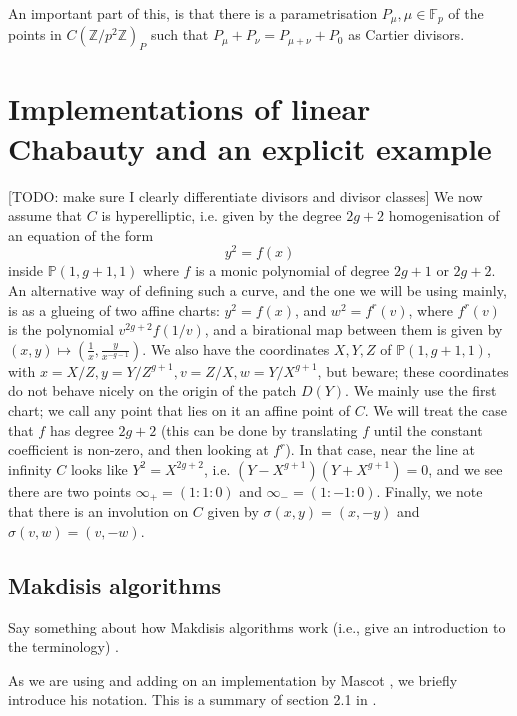 \documentclass[12pt]{article}
\newcommand{\Z}{\mathbb{Z}}
\renewcommand{\P}{\mathbb{P}}
\newcommand{\F}{\mathbb{F}}
\theoremstyle{plain}
\theoremstyle{definition}
\theoremstyle{remark}
\begin{document}
An important part of this, is that there is a parametrisation $P_\mu, \mu \in \F_p$ of the points in $C(\Z/p^2\Z)_P$ such that $P_\mu + P_\nu = P_{\mu + \nu} + P_0$ as Cartier divisors.

\section{Implementations of linear Chabauty and an explicit example}
[TODO: make sure I clearly differentiate divisors and divisor classes]
We now assume that $C$ is hyperelliptic, i.e. given by the degree $2g+2$ homogenisation of an equation of the form
\[
y^2 = f(x)
\]
inside $\P(1,g+1,1)$ where $f$ is a monic polynomial of degree $2g+1$ or $2g+2$. An alternative way of defining such a curve, and the one we will be using mainly, is as a glueing of two affine charts: $y^2 = f(x)$, and $w^2 = f^{r}(v)$, where $f^{r}(v)$ is the polynomial $v^{2g + 2} f(1/v)$, and a birational map between them is given by $(x,y) \mapsto (\frac{1}{x},\frac{y}{x^{-g-1}})$. We also have the coordinates $X,Y,Z$ of $\P(1,g+1,1)$, with $x = X/Z, y = Y/Z^{g+1}, v = Z/X, w = Y/X^{g+1}$, but beware; these coordinates do not behave nicely on the origin of the patch $D(Y)$. We mainly use the first chart; we call any point that lies on it an affine point of $C$. We will treat the case that $f$ has degree $2g+2$ (this can be done by translating $f$ until the constant coefficient is non-zero, and then looking at $f^r$). In that case, near the line at infinity $C$ looks like $Y^2 = X^{2g+2}$, i.e. $(Y-X^{g+1})(Y+X^{g+1}) = 0$, and we see there are two points $\infty_+ = (1:1:0)$ and $\infty_- = (1:-1:0)$. Finally, we note that there is an involution on $C$ given by $\sigma(x,y) = (x,-y)$ and $\sigma(v,w) = (v,-w)$.

\subsection{Makdisis algorithms}
Say something about how Makdisis algorithms work (i.e., give an introduction to the terminology) \cite{makdisi2004}.

As we are using and adding on an implementation by Mascot \cite{mascot2018}, we briefly introduce his notation. This is a summary of section 2.1 in \cite{mascot2018}.
\end{document}
